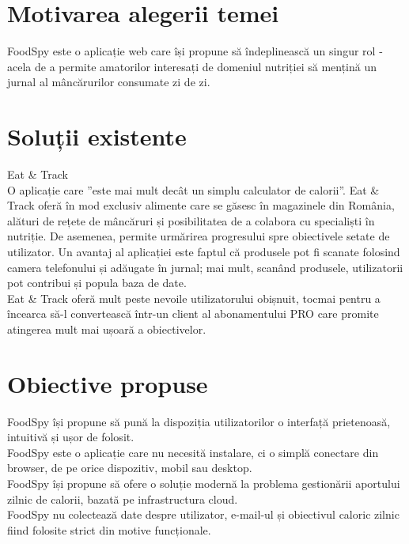 
\section{Motivarea alegerii temei}
FoodSpy este o aplicație web care își propune să îndeplinească un singur rol - acela de a permite amatorilor interesați de domeniul nutriției să mențină un jurnal al mâncărurilor consumate zi de zi.


\section{Soluții existente}
Eat \& Track
\\
O aplicație care ”este mai mult decât un simplu calculator de calorii”. Eat \& Track oferă în mod exclusiv alimente care se găsesc în magazinele din România, alături de rețete de mâncăruri și posibilitatea de a colabora cu specialiști în nutriție. De asemenea, permite urmărirea progresului spre obiectivele setate de utilizator. Un avantaj al aplicației este faptul că produsele pot fi scanate folosind camera telefonului și adăugate în jurnal; mai mult, scanând produsele, utilizatorii pot contribui și popula baza de date.\\
Eat \& Track oferă mult peste nevoile utilizatorului obișnuit, tocmai pentru a încearca să-l convertească într-un client al abonamentului PRO care promite atingerea mult mai ușoară a obiectivelor.


\section{Obiective propuse}
FoodSpy își propune să pună la dispoziția utilizatorilor o interfață prietenoasă, intuitivă și ușor de folosit.\\
FoodSpy este o aplicație care nu necesită instalare, ci o simplă conectare din browser, de pe orice dispozitiv, mobil sau desktop.\\
FoodSpy își propune să ofere o soluție modernă la problema gestionării aportului zilnic de calorii, bazată pe infrastructura cloud.\\
FoodSpy nu colectează date despre utilizator, e-mail-ul și obiectivul caloric zilnic fiind folosite strict din motive funcționale.\\